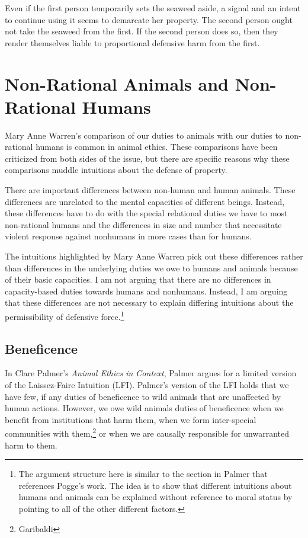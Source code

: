 \documentclass[12pt]{book}
\begin{document}
	Even if the first person temporarily sets the seaweed aside, a signal and
	an intent to continue using it seems to demarcate her property. The second
	person ought not take the seaweed from the first. If the second person does
	so, then they render themselves liable to proportional defensive harm from
	the first.

\section{Non-Rational Animals and Non-Rational Humans}
    
    Mary Anne Warren's comparison of our duties to
    animals with our duties to non-rational humans is common in animal
    ethics. These comparisons have been criticized from both
    sides of the issue, but there are specific reasons why these comparisons
    muddle intuitions about the defense of property.
    
    There are important differences between non-human and human animals.
    These differences are unrelated to the mental capacities of different
    beings. Instead, these differences have to do with the special relational
    duties we have to most non-rational humans and the differences in size and
    number that necessitate violent response against nonhumans in more cases
    than for humans.

	The intuitions highlighted by Mary Anne Warren pick out these differences
	rather than differences in the underlying duties we owe to humans and
	animals because of their basic capacities. I am not arguing that there are
	no differences in capacity-based duties towards humans and nonhumans.
	Instead, I am arguing that these differences are not necessary to explain
	differing intuitions about the permissibility of defensive
	force.\footnote{The argument structure here is similar to the section in
		Palmer that references Pogge’s work. The idea is to show that different
	intuitions about humans and animals can be explained without reference to
	moral status by pointing to all of the other different factors.}

    \subsection{Beneficence}

		In Clare Palmer’s \emph{Animal Ethics in Context}, Palmer argues for a
		limited version of the Laissez-Faire Intuition (LFI). Palmer’s version
		of the LFI holds that we have few, if any duties of beneficence to wild
		animals that are unaffected by human actions. However, we owe wild
		animals duties of beneficence when we benefit from institutions that
		harm them, when we form inter-special communities with
		them,\footnote{Garibaldi} or when we are causally responsible for
		unwarranted harm to them.
\end{document}
